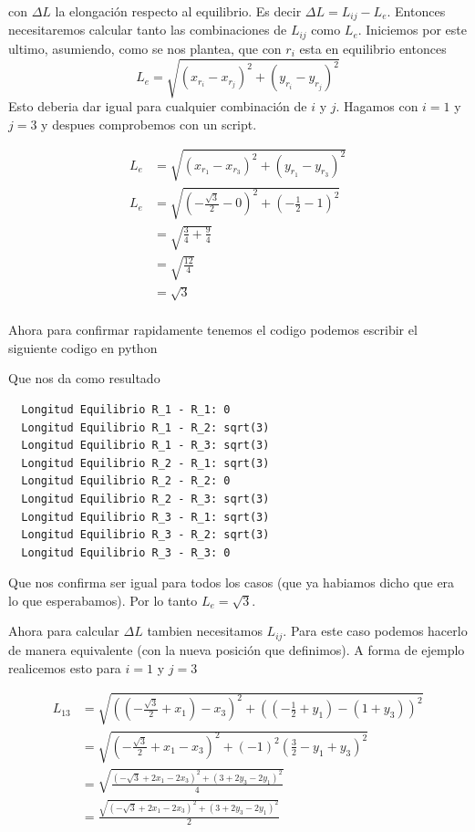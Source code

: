 \documentclass[12pt]{amsart}
\begin{document}
  con $\Delta L$ la elongación respecto al equilibrio. Es decir $\Delta L = L_{ij} - L_e$. Entonces necesitaremos calcular tanto las combinaciones de $L_{ij}$ como $L_e$. Iniciemos por este ultimo, asumiendo, como se nos plantea, que con $r_i$ esta en equilibrio entonces
  $$L_e = \sqrt{(x_{r_i} - x_{r_j})^2 + (y_{r_i} - y_{r_j})^2}$$
  Esto deberia dar igual para cualquier combinación de $i$ y $j$. Hagamos con $i = 1$ y $j = 3$ y despues comprobemos con un script.

  \begin{align*}
    L_e &= \sqrt{(x_{r_1} - x_{r_3})^2 + (y_{r_1} - y_{r_3})^2}\\
    L_e &= \sqrt{\left(-\frac{\sqrt{3}}{2} - 0\right)^2 + (-\frac{1}{2} - 1)^2}\\
    &= \sqrt{\frac{3}{4} + \frac{9}{4}}\\
    &= \sqrt{\frac{12}{4}}\\
    &= \sqrt{3}\\
  \end{align*}

  Ahora para confirmar rapidamente tenemos el codigo podemos escribir el siguiente codigo en python

  

  Que nos da como resultado
  \begin{lstlisting}
  Longitud Equilibrio R_1 - R_1: 0
  Longitud Equilibrio R_1 - R_2: sqrt(3)
  Longitud Equilibrio R_1 - R_3: sqrt(3)
  Longitud Equilibrio R_2 - R_1: sqrt(3)
  Longitud Equilibrio R_2 - R_2: 0
  Longitud Equilibrio R_2 - R_3: sqrt(3)
  Longitud Equilibrio R_3 - R_1: sqrt(3)
  Longitud Equilibrio R_3 - R_2: sqrt(3)
  Longitud Equilibrio R_3 - R_3: 0
  \end{lstlisting}

  Que nos confirma ser igual para todos los casos (que ya habiamos dicho que era lo que esperabamos). Por lo tanto $L_e = \sqrt{3}$.

  Ahora para calcular $\Delta L$ tambien necesitamos $L_{ij}$. Para este caso podemos hacerlo de manera equivalente (con la nueva posición que definimos). A forma de ejemplo realicemos esto para $i = 1$ y $j = 3$

  \begin{align*}
    L_{13} &= \sqrt{\left(\left(-\frac{\sqrt{3}}{2} + x_1\right) - x_3\right)^2 + \left(\left(-\frac{1}{2} + y_1\right) - (1 + y_3)\right)^2}\\
    &= \sqrt{\left(-\frac{\sqrt{3}}{2} + x_1 - x_3\right)^2 + (-1)^2\left(\frac{3}{2} - y_1 + y_3\right)^2}\\
    &= \sqrt{\frac{\left(-\sqrt{3} + 2x_1 - 2x_3\right)^2 + \left(3 + 2y_3 - 2y_1\right)^2}{4}}\\
    &= \frac{\sqrt{\left(-\sqrt{3} + 2x_1 - 2x_3\right)^2 + \left(3 + 2y_3 - 2y_1\right)^2}}{2}
  \end{align*}
\end{document}
